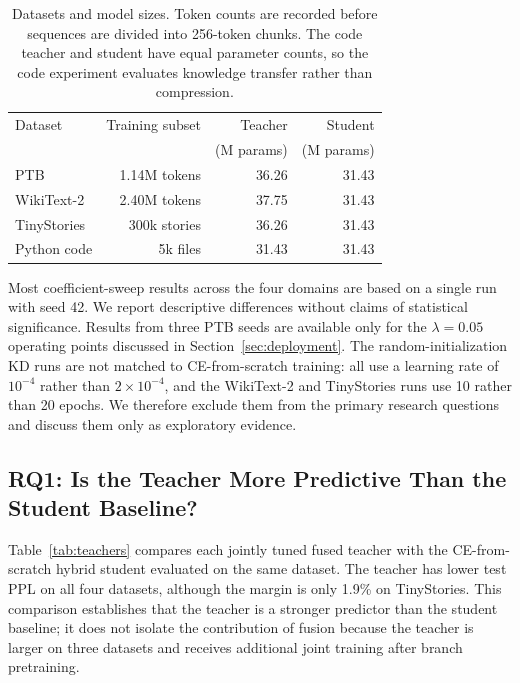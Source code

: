\documentclass[conference]{IEEEtran}
\begin{document}
\begin{table}[t]
\caption{Datasets and model sizes.  Token counts are recorded before
sequences are divided into 256-token chunks.  The code teacher and student
have equal parameter counts, so the code experiment evaluates knowledge
transfer rather than compression.}
\label{tab:data}
\centering
\footnotesize
\setlength{\tabcolsep}{3.4pt}
\begin{tabular}{lrrr}
\toprule
Dataset & Training subset & Teacher & Student \\
 &  & (M params) & (M params) \\
\midrule
PTB & 1.14M tokens & 36.26 & 31.43 \\
WikiText-2 & 2.40M tokens & 37.75 & 31.43 \\
TinyStories & 300k stories & 36.26 & 31.43 \\
Python code & 5k files & 31.43 & 31.43 \\
\bottomrule
\end{tabular}
\end{table}

Most coefficient-sweep results across the four domains are based on a single
run with seed 42.  We report descriptive differences without claims of
statistical significance.  Results from three PTB seeds are available only
for the $\lambda=0.05$ operating points discussed in
Section~\ref{sec:deployment}.  The random-initialization KD runs are not
matched to CE-from-scratch training: all use a learning rate of $10^{-4}$
rather than $2\times10^{-4}$, and the WikiText-2 and TinyStories runs use 10
rather than 20 epochs.  We therefore exclude them from the primary research
questions and discuss them only as exploratory evidence.

\subsection{RQ1: Is the Teacher More Predictive Than the Student Baseline?}

Table~\ref{tab:teachers} compares each jointly tuned fused teacher with the
CE-from-scratch hybrid student evaluated on the same dataset.  The teacher has
lower test PPL on all four datasets, although the margin is only 1.9\% on
TinyStories.  This comparison establishes that the teacher is a stronger
predictor than the student baseline; it does not isolate the contribution of
fusion because the teacher is larger on three datasets and receives additional
joint training after branch pretraining.
\end{document}
